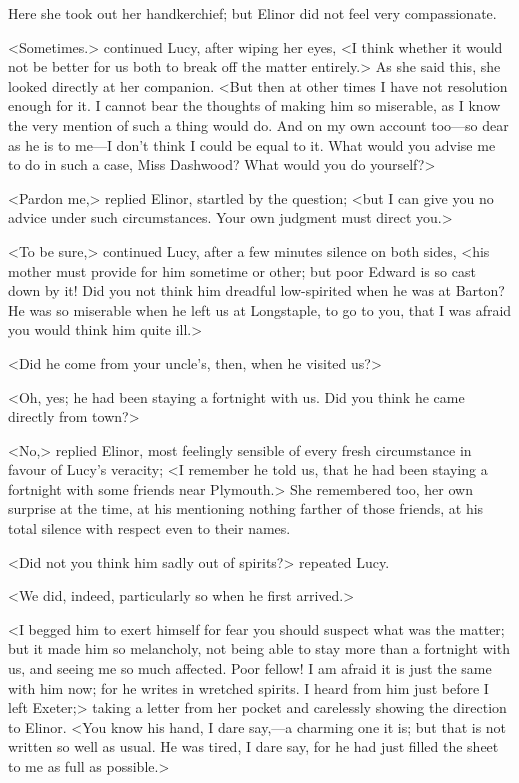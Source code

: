 Here she took out her handkerchief; but Elinor did not feel very compassionate.

<Sometimes.> continued Lucy, after wiping her eyes, <I think whether it would not be better for us both to break off the matter entirely.> As she said this, she looked directly at her companion. <But then at other times I have not resolution enough for it. I cannot bear the thoughts of making him so miserable, as I know the very mention of such a thing would do. And on my own account too—so dear as he is to me—I don't think I could be equal to it. What would you advise me to do in such a case, Miss Dashwood? What would you do yourself?>

<Pardon me,> replied Elinor, startled by the question; <but I can give you no advice under such circumstances. Your own judgment must direct you.>

<To be sure,> continued Lucy, after a few minutes silence on both sides, <his mother must provide for him sometime or other; but poor Edward is so cast down by it! Did you not think him dreadful low-spirited when he was at Barton? He was so miserable when he left us at Longstaple, to go to you, that I was afraid you would think him quite ill.>

<Did he come from your uncle's, then, when he visited us?>

<Oh, yes; he had been staying a fortnight with us. Did you think he came directly from town?>

<No,> replied Elinor, most feelingly sensible of every fresh circumstance in favour of Lucy's veracity; <I remember he told us, that he had been staying a fortnight with some friends near Plymouth.> She remembered too, her own surprise at the time, at his mentioning nothing farther of those friends, at his total silence with respect even to their names.

<Did not you think him sadly out of spirits?> repeated Lucy.

<We did, indeed, particularly so when he first arrived.>

<I begged him to exert himself for fear you should suspect what was the matter; but it made him so melancholy, not being able to stay more than a fortnight with us, and seeing me so much affected. Poor fellow! I am afraid it is just the same with him now; for he writes in wretched spirits. I heard from him just before I left Exeter;> taking a letter from her pocket and carelessly showing the direction to Elinor. <You know his hand, I dare say,—a charming one it is; but that is not written so well as usual. He was tired, I dare say, for he had just filled the sheet to me as full as possible.>


